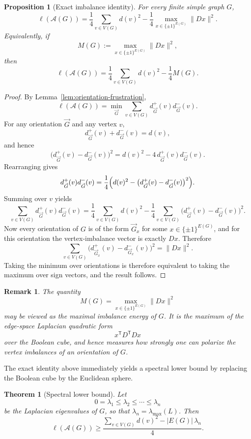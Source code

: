 \documentclass[11pt]{article}
\newtheorem{theorem}{Theorem}
\newtheorem{proposition}{Proposition}
\newtheorem{remark}{Remark}
\theoremstyle{plain}
\begin{document}
\begin{proposition}[Exact imbalance identity]
\label{prop:imbalance-identity}
For every finite simple graph $G$,
\[
\ell(\mathcal A(G))
=
\frac14\sum_{v\in V(G)} d(v)^2
-
\frac14\max_{x\in\{\pm1\}^{E(G)}} \|Dx\|^2.
\]
Equivalently, if
\[
M(G):=\max_{x\in\{\pm1\}^{E(G)}} \|Dx\|^2,
\]
then
\[
\ell(\mathcal A(G))
=
\frac14\sum_{v\in V(G)} d(v)^2-\frac14 M(G).
\]
\end{proposition}

\begin{proof}
By Lemma~\ref{lem:orientation-frustration},
\[
\ell(\mathcal A(G))
=
\min_{\vec G}\sum_{v\in V(G)} d^+_{\vec G}(v)d^-_{\vec G}(v).
\]
For any orientation $\vec G$ and any vertex $v$,
\[
d^+_{\vec G}(v)+d^-_{\vec G}(v)=d(v),
\]
and hence
\[
\bigl(d^+_{\vec G}(v)-d^-_{\vec G}(v)\bigr)^2
=
d(v)^2-4\,d^+_{\vec G}(v)d^-_{\vec G}(v).
\]
Rearranging gives
\[
d^+_{\vec G}(v)d^-_{\vec G}(v)
=
\frac14\Bigl(d(v)^2-\bigl(d^+_{\vec G}(v)-d^-_{\vec G}(v)\bigr)^2\Bigr).
\]
Summing over $v$ yields
\[
\sum_{v\in V(G)} d^+_{\vec G}(v)d^-_{\vec G}(v)
=
\frac14\sum_{v\in V(G)} d(v)^2
-
\frac14\sum_{v\in V(G)} \bigl(d^+_{\vec G}(v)-d^-_{\vec G}(v)\bigr)^2.
\]
Now every orientation of $G$ is of the form $\vec G_x$ for some
$x\in\{\pm1\}^{E(G)}$, and for this orientation the vertex-imbalance vector is
exactly $Dx$.
Therefore
\[
\sum_{v\in V(G)} \bigl(d^+_{\vec G_x}(v)-d^-_{\vec G_x}(v)\bigr)^2
=
\|Dx\|^2.
\]
Taking the minimum over orientations is therefore equivalent to taking the
maximum over sign vectors, and the result follows.
\end{proof}

\begin{remark}
The quantity
\[
M(G)=\max_{x\in\{\pm1\}^{E(G)}} \|Dx\|^2
\]
may be viewed as the \emph{maximal imbalance energy} of $G$.
It is the maximum of the edge-space Laplacian quadratic form
\[
x^{\mathsf T}D^{\mathsf T}Dx
\]
over the Boolean cube, and hence measures how strongly one can polarize the
vertex imbalances of an orientation of $G$.
\end{remark}

The exact identity above immediately yields a spectral lower bound by replacing
the Boolean cube by the Euclidean sphere.

\begin{theorem}[Spectral lower bound]
\label{thm:spectral-lower}
Let
\[
0=\lambda_1\le \lambda_2\le \cdots \le \lambda_n
\]
be the Laplacian eigenvalues of $G$, so that $\lambda_n=\lambda_{\max}(L)$.
Then
\[
\ell(\mathcal A(G))
\ge
\frac{\sum_{v\in V(G)} d(v)^2-|E(G)|\,\lambda_n}{4}.
\]
\end{theorem}
\end{document}
